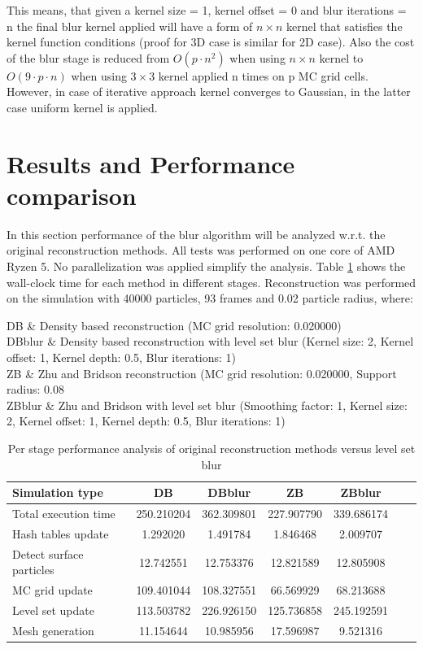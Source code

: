 This means, that given a kernel size = 1, kernel offset = 0 and blur iterations = n the final blur kernel applied will have a form of $ n \times n$ kernel that satisfies the kernel function conditions (proof for 3D case is similar for 2D case). Also the cost of the blur stage is reduced from $O(p \cdot n^2)$ when using $n \times n$ kernel to $O(9 \cdot p \cdot n)$ when using $3\times 3$ kernel applied n times on p MC grid cells. However, in  case of iterative approach kernel converges to Gaussian, in the latter case uniform kernel is applied. 


\section{Results and Performance comparison}
In this section performance of the blur algorithm will be analyzed w.r.t. the original reconstruction methods. All tests was performed on one core of AMD Ryzen 5. No parallelization was applied simplify the analysis.
Table \ref{tab:perf_analysis} shows the wall-clock time for each method in different stages.
Reconstruction was performed on the simulation with 40000 particles, 93 frames and 0.02 particle radius, where:
\begin{conditions}
	DB & Density based reconstruction (MC grid resolution: 0.020000)\\
	DBblur & Density based reconstruction with level set blur (Kernel size: 2, Kernel offset: 1, Kernel depth: 0.5, Blur iterations: 1)\\
	ZB & Zhu and Bridson reconstruction (MC grid resolution: 0.020000, Support radius: 0.08\\
	ZBblur & Zhu and Bridson with level set blur (Smoothing factor: 1, Kernel size: 2, Kernel offset: 1, Kernel depth: 0.5, Blur iterations: 1)\\
\end{conditions}
\begin{table}[h]
	\begin{center}
		\scriptsize
		\begin{tabular}{|l|c|c|c|c|c|c|}
			\hline
			Simulation type & DB & DBblur & ZB & ZBblur \\
			\hline
			Total execution time		&	250.210204	&	362.309801	&	227.907790	&	339.686174	\\
			Hash tables update			&	1.292020	&	1.491784	&	1.846468	&	2.009707	\\
			Detect surface particles	&	12.742551	&	12.753376	&	12.821589	&	12.805908	\\
			MC grid update				&	109.401044	&	108.327551	&	66.569929	&	68.213688	\\
			Level set update			&	113.503782	&	226.926150	&	125.736858	&	245.192591	\\
			Mesh generation				&	11.154644	&	10.985956	&	17.596987	&	9.521316	\\
			\hline
		\end{tabular}
	\end{center}
	\caption{Per stage performance analysis of original reconstruction methods versus level set blur}
	\label{tab:perf_analysis}
\end{table}

